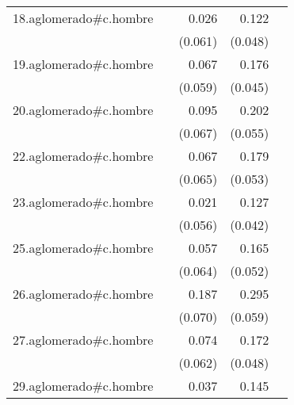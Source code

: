{\begin{longtable}{l*{4}{D{.}{.}{-1}}}
\addlinespace
18.aglomerado#c.hombre&                     &       0.026         &       0.122\sym{*}  &                     \\
            &                     &     (0.061)         &     (0.048)         &                     \\
\addlinespace
19.aglomerado#c.hombre&                     &       0.067         &       0.176\sym{***}&                     \\
            &                     &     (0.059)         &     (0.045)         &                     \\
\addlinespace
20.aglomerado#c.hombre&                     &       0.095         &       0.202\sym{***}&                     \\
            &                     &     (0.067)         &     (0.055)         &                     \\
\addlinespace
22.aglomerado#c.hombre&                     &       0.067         &       0.179\sym{***}&                     \\
            &                     &     (0.065)         &     (0.053)         &                     \\
\addlinespace
23.aglomerado#c.hombre&                     &       0.021         &       0.127\sym{**} &                     \\
            &                     &     (0.056)         &     (0.042)         &                     \\
\addlinespace
25.aglomerado#c.hombre&                     &       0.057         &       0.165\sym{**} &                     \\
            &                     &     (0.064)         &     (0.052)         &                     \\
\addlinespace
26.aglomerado#c.hombre&                     &       0.187\sym{**} &       0.295\sym{***}&                     \\
            &                     &     (0.070)         &     (0.059)         &                     \\
\addlinespace
27.aglomerado#c.hombre&                     &       0.074         &       0.172\sym{***}&                     \\
            &                     &     (0.062)         &     (0.048)         &                     \\
\addlinespace
29.aglomerado#c.hombre&                     &       0.037         &       0.145\sym{***}&                     \\

\end{longtable}}
